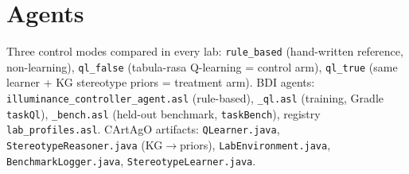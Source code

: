 \documentclass[10pt,a4paper]{article}
\newcommand{\file}[1]{\texttt{\small #1}}
\newcommand{\kw}[1]{\textbf{#1}}
\begin{document}
\vspace{-2pt}
\begin{center}
\end{center}

\section{Agents}
Three control modes compared in every lab: \file{rule\_based} (hand-written reference, non-learning),
\file{ql\_false} (tabula-rasa Q-learning = control arm), \file{ql\_true} (same learner + KG stereotype
priors = treatment arm). BDI agents: \file{illuminance\_controller\_agent.asl} (rule-based),
\file{\_ql.asl} (training, Gradle \file{taskQl}), \file{\_bench.asl} (held-out benchmark, \file{taskBench}),
registry \file{lab\_profiles.asl}. CArtAgO artifacts: \file{QLearner.java}, \file{StereotypeReasoner.java}
(KG\(\to\)priors), \file{LabEnvironment.java}, \file{BenchmarkLogger.java}, \file{StereotypeLearner.java}.
\end{document}
